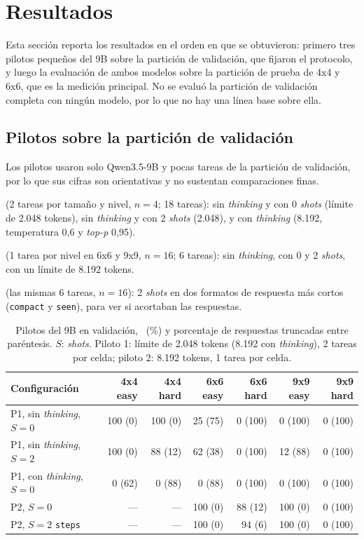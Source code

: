 \section{Resultados}
\label{sec:resultados}

Esta sección reporta los resultados en el orden en que se obtuvieron: primero
tres pilotos pequeños del 9B sobre la partición de validación, que fijaron el
protocolo, y luego la evaluación de ambos modelos sobre la partición de prueba
de 4x4 y 6x6, que es la medición principal. No se evaluó la partición de
validación completa con ningún modelo, por lo que no hay una línea base sobre
ella.

\subsection{Pilotos sobre la partición de validación}
\label{sec:pilotos}
Los pilotos usaron solo Qwen3.5-9B y pocas tareas de la partición de validación,
por lo que sus cifras son orientativas y no sustentan comparaciones finas.
\begin{description}[leftmargin=0pt]
  \item[Piloto 1] (2 tareas por tamaño y nivel, $n = 4$; 18 tareas): sin
  \emph{thinking} y con 0 \emph{shots} (límite de 2.048 tokens), sin \emph{thinking}
  y con 2 \emph{shots} (2.048), y con \emph{thinking} (8.192, temperatura 0{,}6
  y \emph{top-p} 0{,}95).
  \item[Piloto 2] (1 tarea por nivel en 6x6 y 9x9, $n = 16$; 6 tareas): sin
  \emph{thinking}, con 0 y 2 \emph{shots}, con un límite de 8.192 tokens.
  \item[Piloto 3] (las mismas 6 tareas, $n = 16$): 2 \emph{shots} en dos
  formatos de respuesta más cortos (\texttt{compact} y \texttt{seen}), para ver
  si acortaban las respuestas.
\end{description}

\begin{table}[htbp]
  \centering\small
  \caption{Pilotos del 9B en validación, \passuno\ (\%) y porcentaje de
  respuestas truncadas entre paréntesis. $S$: \emph{shots}. Piloto 1:
  límite de 2.048 tokens (8.192 con \emph{thinking}), 2 tareas por celda;
  piloto 2: 8.192 tokens, 1 tarea por celda.}
  \label{tab:pilotos}
  \begin{tabular}{@{}lrrrrrr@{}}
    \toprule
    Configuración & 4x4 easy & 4x4 hard & 6x6 easy & 6x6 hard & 9x9 easy
      & 9x9 hard \\
    \midrule
    P1, sin \emph{thinking}, $S=0$ & 100 (0) & 100 (0) & 25 (75) & 0 (100) & 0 (100) & 0 (100) \\
    P1, sin \emph{thinking}, $S=2$ & 100 (0) & 88 (12) & 62 (38) & 0 (100) & 12 (88) & 0 (100) \\
    P1, con \emph{thinking}, $S=0$ & 0 (62) & 0 (88) & 0 (88) & 0 (100) & 0 (100) & 0 (100) \\
    \midrule
    P2, $S=0$ & --- & --- & 100 (0) & 88 (12) & 100 (0) & 0 (100) \\
    P2, $S=2$ \texttt{steps} & --- & --- & 100 (0) & 94 (6) & 100 (0) & 0 (100) \\
    \bottomrule
  \end{tabular}
\end{table}

